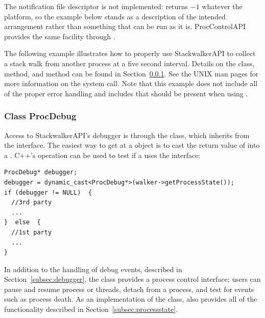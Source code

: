 The notification file descriptor is not implemented: 
returns $-1$ whatever the platform, so the example below stands as a
description of the intended arrangement rather than something that can be run
as it is. ProcControlAPI provides the same facility through
.

The following example illustrates how to properly use StackwalkerAPI to collect
a stack walk from another process at a five second interval. Details on the
 class,  method, and
 method can be
found in Section~\ref{subsubsec:procdebug}. See the UNIX man pages for more information on the
 system call. Note that this example does not include all of the proper
error handling and includes that should be present when using .




\subsubsection{Class ProcDebug}
\label{subsubsec:procdebug}

Access to StackwalkerAPI's debugger is through the  class, which
inherits from the  interface. The easiest way to get at a
 object is to cast the return value of
 into a . C++'s
 operation can be used to test if a  uses the
 interface:

\begin{lstlisting}
ProcDebug* debugger;
debugger = dynamic_cast<ProcDebug*>(walker->getProcessState());
if (debugger != NULL)  {
  //3rd party
  ...
}  else  {
  //1st party
  ...
}
\end{lstlisting}

In addition to the handling of debug events, described in
Section~\ref{subsec:debugger}, the  class provides a process
control interface; users can pause and resume process or threads, detach from a
process, and test for events such as process death. As an implementation of the
 class,  also provides all of the
functionality described in Section~\ref{subsec:processstate}.

